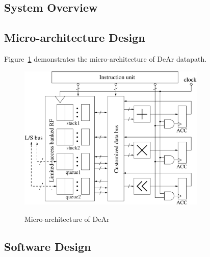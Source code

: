 \documentclass[12pt]{article}
\begin{document}
\begin{CJK}{UTF8}{bkai}
    \subsection{System Overview}
    \subsection{Micro-architecture Design}
        Figure~\ref{fig:micro} demonstrates the micro-architecture of DeAr datapath.
        \begin{figure}[!ht] 
            \caption{Micro-architecture of DeAr}
            \centering
            \includegraphics[width=0.8\textwidth]{./figs/micro.eps}
            \label{fig:micro}
        \end{figure}
    \subsection{Software Design}

\end{CJK}
\end{document}
